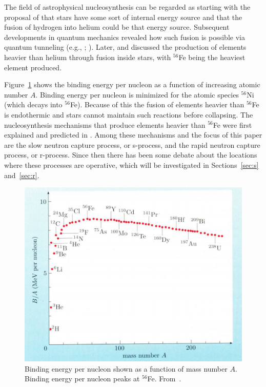 The field of astrophysical nucleosynthesis can be regarded as starting with the proposal of \cite{eddington1920} that stars have some sort of internal energy source and that the fusion of hydrogen into helium could be that energy source.  Subsequent developments in quantum mechanics revealed how such fusion is possible via quantum tunneling (e.g., \citealt{gurneycondon1928}; \citealt{atkinson1929}). Later, \cite{hoyle1946} and \cite{hoyle1954} discussed the production of elements heavier than helium through fusion inside stars, with $^{56}$Fe being the heaviest element produced.

Figure~\ref{fig:be} shows the binding energy per nucleon as a function of increasing atomic number $A$.  Binding energy per nucleon is minimized for the atomic species $^{56}$Ni (which decays into $^{56}$Fe).  Because of this the fusion of elements heavier than $^{56}$Fe is endothermic and stars cannot maintain such reactions before collapsing.  The nucleosynthesis mechanisms that produce elements heavier than $^{56}$Fe were first explained and predicted in \cite{burbidge1957}.  Among these mechanisms and the focus of this paper are the slow neutron capture process, or s-process, and the rapid neutron capture process, or r-process.  
Since then there has been some debate about the locations where these processes are operative, which will be investigated in Sections~\ref{sec:s} and~\ref{sec:r}.

\begin{figure}
\includegraphics[width=\linewidth]{pdf/bindingenergy.png}
\caption{\label{fig:be}Binding energy per nucleon shown as a function of mass number $A$.  Binding energy per nucleon peaks at $^{56}$Fe.  From~\cite{ryan2010}.}
\end{figure}


